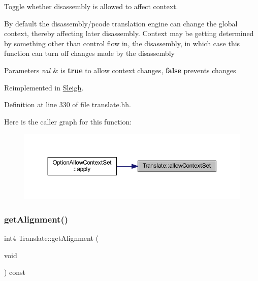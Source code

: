 Toggle whether disassembly is allowed to affect context. 

By default the disassembly/pcode translation engine can change the global context, thereby affecting later disassembly. Context may be getting determined by something other than control flow in, the disassembly, in which case this function can turn off changes made by the disassembly 
\begin{DoxyParams}{Parameters}
{\em val} & is {\bfseries{true}} to allow context changes, {\bfseries{false}} prevents changes \\
\hline
\end{DoxyParams}


Reimplemented in \mbox{\hyperlink{class_sleigh_a82409ca16da71a07eb338aa71b64882c}{Sleigh}}.



Definition at line 330 of file translate.\+hh.

Here is the caller graph for this function\+:
\nopagebreak
\begin{figure}[H]
\begin{center}
\leavevmode
\includegraphics[width=350pt]{class_translate_ae74cac44825c3979c65c105bc66cd63c_icgraph}
\end{center}
\end{figure}
\mbox{\label{class_translate_aeb013fbe5257988ffea2f8147b96620a}} 
\subsubsection{\texorpdfstring{getAlignment()}{getAlignment()}}
{\footnotesize\ttfamily int4 Translate\+::get\+Alignment (\begin{DoxyParamCaption}\item[{void}]{ }\end{DoxyParamCaption}) const\hspace{0.3cm}{\ttfamily [inline]}}



